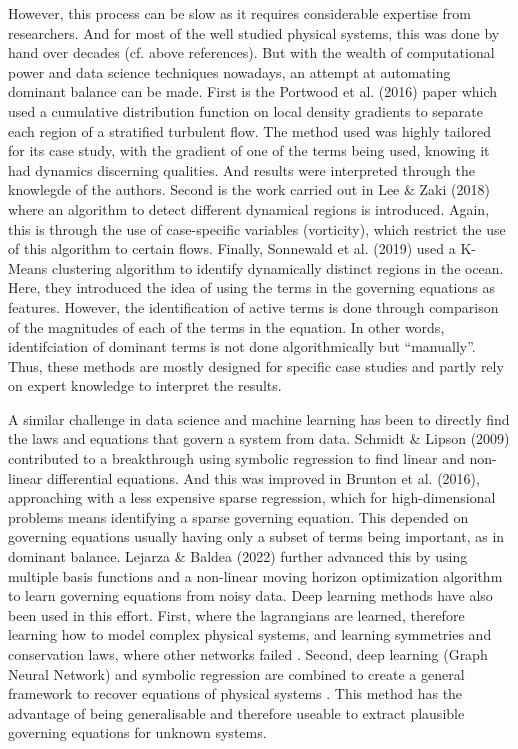 \documentclass[12pt]{report} %
\begin{document}
However, this process can be slow as it requires considerable expertise from researchers. And for most of the well studied physical systems, this was done by hand over decades (cf. above references). But with the wealth of computational power and data science techniques nowadays, an attempt at automating dominant balance can be made. First is the Portwood et al. (2016)\cite{portwood2016robust} paper which used a cumulative distribution function on local density gradients to separate each region of a stratified turbulent flow. The method used was highly tailored for its case study, with the gradient of one of the terms being used, knowing it had dynamics discerning qualities. And results were interpreted through the knowlegde of the authors. Second is the work carried out in Lee \& Zaki (2018)\cite{lee2018detection} where an algorithm to detect different dynamical regions is introduced. Again, this is through the use of case-specific variables (vorticity), which restrict the use of this algorithm to certain flows. Finally, Sonnewald et al. (2019)\cite{sonnewald2019unsupervised} used a K-Means clustering algorithm to identify dynamically distinct regions in the ocean. Here, they introduced the idea of using the terms in the governing equations as features. However, the identification of active terms is done through comparison of the magnitudes of each of the terms in the equation. In other words, identifciation of dominant terms is not done algorithmically but ``manually''. Thus, these methods are mostly designed for specific case studies and partly rely on expert knowledge to interpret the results.

\vspace{5mm}

A similar challenge in data science and machine learning has been to directly find the laws and equations that govern a system from data. Schmidt \& Lipson (2009)\cite{schmidt2009distilling} contributed to a breakthrough using symbolic regression to find linear and non-linear differential equations. And this was improved in Brunton et al. (2016)\cite{brunton2016discovering}, approaching with a less expensive sparse regression, which for high-dimensional problems means identifying a sparse governing equation. This depended on governing equations usually having only a subset of terms being important, as in dominant balance. Lejarza \& Baldea (2022)\cite{lejarza2022data} further advanced this by using multiple basis functions and a non-linear moving horizon optimization algorithm to learn governing equations from noisy data. Deep learning methods have also been used in this effort. First, where the lagrangians are learned, therefore learning how to model complex physical systems, and learning symmetries and conservation laws, where other networks failed \cite{cranmer2020lagrangian}. Second, deep learning (Graph Neural Network) and symbolic regression are combined to create a general framework to recover equations of physical systems \cite{cranmer2020discovering}. This method has the advantage of being generalisable and therefore useable to extract plausible governing equations for unknown systems.
\end{document}
